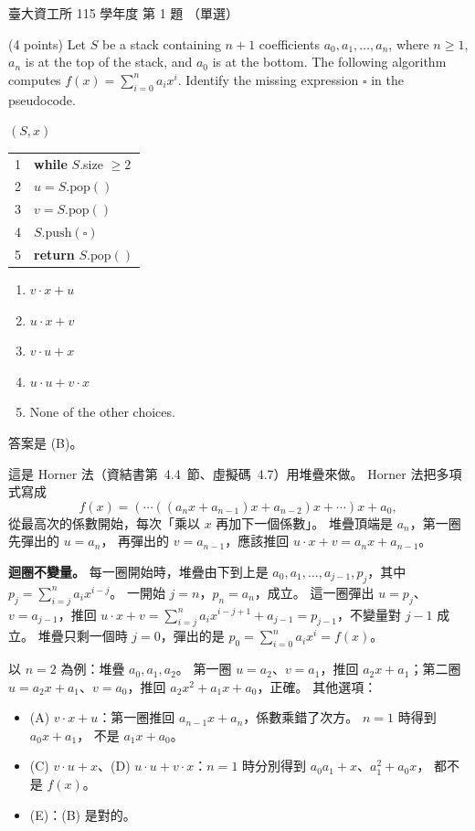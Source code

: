 \begin{pastexam}[label={px:ntu-115-dsa-01}]{臺大資工所 115 學年度 第 1 題}
（單選）

(4 points) Let $S$ be a stack containing $n+1$ coefficients $a_0,a_1,\ldots,a_n$, where $n\ge 1$, $a_n$ is at the top of the stack, and $a_0$ is at the bottom. The following algorithm computes $f(x)=\sum_{i=0}^{n}a_ix^i$. Identify the missing expression $\square$ in the pseudocode.

$(S,x)$
\par\smallskip\noindent\begin{tabular}{@{}r@{\quad}l@{}}
1 & \textbf{while} $S$.size $\ge 2$\\
2 & \qquad $u = S.\mathrm{pop}()$\\
3 & \qquad $v = S.\mathrm{pop}()$\\
4 & \qquad $S.\mathrm{push}(\square)$\\
5 & \textbf{return} $S.\mathrm{pop}()$
\end{tabular}\par\smallskip
\begin{enumerate}[label=(\Alph*)]
\item $v\cdot x+u$
\item $u\cdot x+v$
\item $v\cdot u+x$
\item $u\cdot u+v\cdot x$
\item None of the other choices.
\end{enumerate}
\end{pastexam}

\begin{pastsoln}
答案是 (B)。

這是 Horner 法（資結書第~4.4~節、虛擬碼~4.7）用堆疊來做。 Horner 法把多項式寫成
\[
f(x) = (\cdots((a_n x + a_{n-1}) x + a_{n-2}) x + \cdots) x + a_0,
\]
從最高次的係數開始，每次「乘以 $x$ 再加下一個係數」。 堆疊頂端是 $a_n$，第一圈先彈出的 $u = a_n$，
再彈出的 $v = a_{n-1}$，應該推回 $u \cdot x + v = a_n x + a_{n-1}$。

\textbf{迴圈不變量。} 每一圈開始時，堆疊由下到上是 $a_0, a_1, \ldots, a_{j-1}, p_j$，其中
$p_j = \sum_{i=j}^{n} a_i x^{i-j}$。 一開始 $j = n$，$p_n = a_n$，成立。 這一圈彈出 $u = p_j$、
$v = a_{j-1}$，推回 $u \cdot x + v = \sum_{i=j}^{n} a_i x^{i-j+1} + a_{j-1} = p_{j-1}$，不變量對 $j - 1$
成立。 堆疊只剩一個時 $j = 0$，彈出的是 $p_0 = \sum_{i=0}^{n} a_i x^i = f(x)$。

以 $n = 2$ 為例：堆疊 $a_0, a_1, a_2$。 第一圈 $u = a_2$、$v = a_1$，推回 $a_2 x + a_1$；第二圈
$u = a_2 x + a_1$、$v = a_0$，推回 $a_2 x^2 + a_1 x + a_0$，正確。 其他選項：
\begin{itemize}
\item (A) $v \cdot x + u$：第一圈推回 $a_{n-1} x + a_n$，係數乘錯了次方。 $n = 1$ 時得到 $a_0 x + a_1$，
不是 $a_1 x + a_0$。
\item (C) $v \cdot u + x$、(D) $u \cdot u + v \cdot x$：$n = 1$ 時分別得到 $a_0 a_1 + x$、$a_1^2 + a_0 x$，
都不是 $f(x)$。
\item (E)：(B) 是對的。
\end{itemize}
\end{pastsoln}
